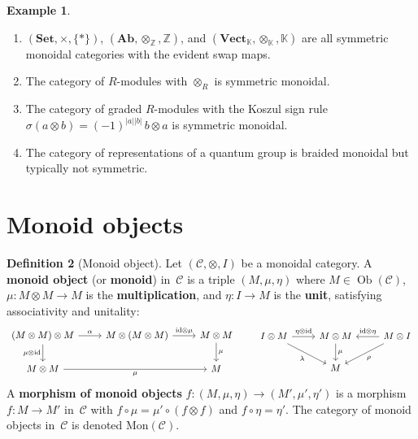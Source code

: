 \documentclass[a4paper,12pt]{book}
\DeclareMathOperator{\Ob}{Ob}
\newcommand{\Set}{\mathbf{Set}}
\newcommand{\Ab}{\mathbf{Ab}}
\newcommand{\Vect}{\mathbf{Vect}}
\newcommand{\id}{\mathrm{id}}
\newcommand{\Z}{\mathbb{Z}}
\newcommand{\K}{\mathbb{K}}
\theoremstyle{definition}
\newtheorem{definition}{Definition}[section]
\newtheorem{example}[definition]{Example}
\theoremstyle{plain}
\theoremstyle{remark}
\begin{document}
\begin{example}\label{ex:braided-symmetric}
\begin{enumerate}[label=(\roman*)]
\item $(\Set, \times, \{*\})$, $(\Ab, \otimes_\Z, \Z)$, and
      $(\Vect_\K, \otimes_\K, \K)$ are all symmetric monoidal categories
      with the evident swap maps.
\item The category of $R$-modules with $\otimes_R$ is symmetric monoidal.
\item The category of graded $R$-modules with the Koszul sign rule
      $\sigma(a\otimes b) = (-1)^{|a||b|}\, b\otimes a$ is symmetric monoidal.
\item The category of representations of a quantum group is braided
      monoidal but typically not symmetric.
\end{enumerate}
\end{example}



\section{Monoid objects}\label{sec:monoid-objects}


\begin{definition}[Monoid object]\label{def:monoid-object}
Let $(\mathcal{C}, \otimes, I)$ be a monoidal category.
A \textbf{monoid object} (or \textbf{monoid}) in~$\mathcal{C}$ is a
triple $(M, \mu, \eta)$ where $M\in\Ob(\mathcal{C})$,
$\mu\colon M\otimes M \to M$ is the \textbf{multiplication}, and
$\eta\colon I\to M$ is the \textbf{unit}, satisfying associativity
and unitality:
\[
\begin{tikzcd}
(M\otimes M)\otimes M \arrow[r, "\alpha"] \arrow[d, "\mu\otimes\id"'] &
M\otimes(M\otimes M) \arrow[r, "\id\otimes\mu"] &
M\otimes M \arrow[d, "\mu"] \\
M\otimes M \arrow[rr, "\mu"'] && M
\end{tikzcd}
\qquad
\begin{tikzcd}
I\otimes M \arrow[r, "\eta\otimes\id"] \arrow[dr, "\lambda"'] &
M\otimes M \arrow[d, "\mu"] &
M\otimes I \arrow[l, "\id\otimes\eta"'] \arrow[dl, "\rho"] \\
& M &
\end{tikzcd}
\]
A \textbf{morphism of monoid objects} $f\colon (M,\mu,\eta)\to (M',\mu',\eta')$
is a morphism $f\colon M\to M'$ in~$\mathcal{C}$ with
$f\circ\mu = \mu'\circ(f\otimes f)$ and $f\circ\eta = \eta'$.
The category of monoid objects in~$\mathcal{C}$ is denoted
$\mathrm{Mon}(\mathcal{C})$.
\end{definition}
\end{document}
